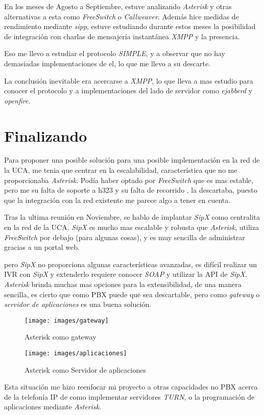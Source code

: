 \documentclass{article}
\begin{document}
En los meses de Agosto a Septiembre, estuve analizando \emph{Asterisk} y otras alternativas a esta como \emph{FreeSwitch} o \emph{Callweaver}. Además hice medidas de rendimiento mediante \emph{sipp}, estuve estudiando durante estos meses la posibilidad de integración con charlas de mensajería instantánea \emph{XMPP} y la presencia.

Eso me llevo a estudiar el protocolo \emph{SIMPLE}, y a observar que no hay demasiadas implementaciones de el, lo que me llevo a su descarte.

La conclusión inevitable era acercarse a \emph{XMPP}, lo que lleva a mas estudio para conocer el protocolo y a implementaciones del lado de servidor como \emph{ejabberd} y \emph{openfire}.

\section{Finalizando}
\label{sec:finalizando}

Para proponer una posible solución para una posible implementación en la red de la UCA, me tenia que centrar en la escalabilidad, característica que no me proporcionaba \emph{Asterisk}. Podía haber optado por \emph{FreeSwitch} que es mas estable, pero me su falta de soporte a h323 y su falta de recorrido , la descartaba, puesto que la integración con la red existente me parece algo a tener en cuenta.


Tras la ultima reunión en Noviembre, se hablo de implantar \emph{SipX} como centralita en la red de la UCA. \emph{SipX} es mucho mas escalable y robusta que \emph{Asterisk}, utiliza \emph{FreeSwitch} por debajo (para algunas cosas), y es muy sencilla de administrar gracias a un portal web.

pero \emph{SipX} no proporciona algunas características avanzadas, es difícil realizar un IVR con \emph{SipX} y extenderlo requiere conocer \emph{SOAP} y utilizar la API de \emph{SipX}. \emph{Asterisk} brinda muchas mas opciones para la extensibilidad, de una manera sencilla, es cierto que como PBX puede que sea descartable, pero como \emph{gateway} o \emph{servidor de aplicaciones} es una buena solución.

\begin{figure}[!h]
  \centering
  \texttt{[image: images/gateway]}
  \caption{Asterisk como gateway}
\end{figure}

\begin{figure}[!h]
  \centering
  \texttt{[image: images/aplicaciones]}
  \caption{Asterisk como Servidor de aplicaciones}
\end{figure}
Esta situación me hizo reenfocar mi proyecto a otras capacidades no PBX acerca de la telefonía IP de como implementar servidores \emph{TURN}, o la programación de aplicaciones mediante \emph{Asterisk}. 
\end{document}

